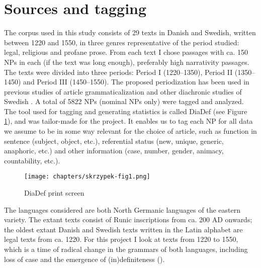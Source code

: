 \documentclass[output=paper]{langsci/langscibook}
\begin{document}
\section{Sources and tagging}\label{6sec:3}

The corpus used in this study consists of 29 texts in Danish and Swedish, written between 1220 and 1550, in three genres representative of the period studied: legal, religious and profane prose. From each text I chose passages with ca. 150 NPs in each (if the text was long enough), preferably high narrativity passages. The texts were divided into three periods: Period I (1220--1350), Period II (1350--1450) and Period III (1450--1550). The proposed periodization has been used in previous studies of article grammaticalization and other diachronic studies of Swedish \citep{delsing:12}. A total of 5822 NPs (nominal NPs only) were tagged and analyzed. The tool used for tagging and generating statistics is called DiaDef (see Figure \ref{6fig:1}), and was tailor-made for the project. It enables us to tag each NP for all data we assume to be in some way relevant for the choice of article, such as function in sentence (subject, object, etc.), referential status (new, unique, generic, anaphoric, etc.) and other information (case, number, gender, animacy, countability, etc.).

\begin{figure}[t]
\texttt{[image: chapters/skrzypek-fig1.png]}
\caption{DiaDef print screen}\label{6fig:1}
\end{figure}


The languages considered are both North Germanic languages of the eastern variety. The extant texts consist of Runic inscriptions from ca. 200 AD onwards; the oldest extant Danish and Swedish texts written in the Latin alphabet are legal texts from ca. 1220. For this project I look at texts from 1220 to 1550, which is a time of radical change in the grammars of both languages, including loss of case and the emergence of (in)definiteness ().
\end{document}
